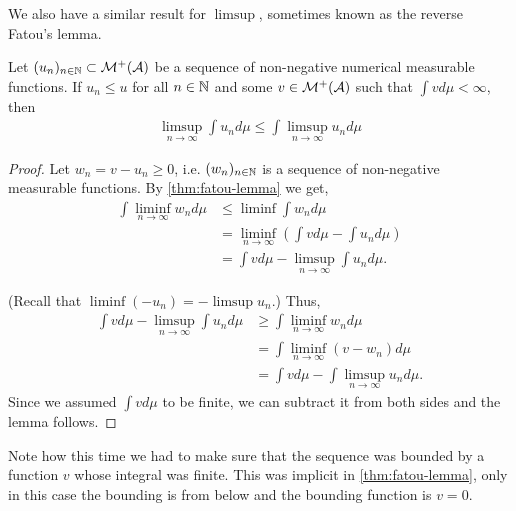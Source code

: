 We also have a similar result for $\limsup$, sometimes known as the reverse Fatou's lemma.

\begin{cor}
	\label{cor:reverse-fatou}
	
	Let $(u_n)_{n\in\mathbb{N}} \subset \mathcal{M}^+(\mathcal{A})$ be a sequence of non-negative numerical measurable functions. If $u_n \leq u$ for all $n \in \mathbb{N}$ and some $v \in \mathcal{M}^+(\mathcal{A})$ such that $\int v d\mu < \infty$, then
	\begin{align}
		\limsup_{n\to\infty} \int u_n d\mu \leq \int \limsup_{n\to \infty} u_n d\mu
	\end{align}
\end{cor}

\begin{proof}
	Let $w_n = v - u_n \geq 0$, i.e. $(w_n)_{n\in\mathbb{N}}$ is a sequence of non-negative measurable functions. By \autoref{thm:fatou-lemma} we get,
	\begin{align*}
		\int \liminf_{n\to \infty} w_n d\mu
		&\leq \liminf \int w_n d\mu \\
		&= \liminf_{n\to \infty} \left( \int v d\mu - \int u_n d\mu \right)\\
		&= \int vd\mu - \limsup_{n\to\infty} \int u_n d\mu.
	\end{align*}
	
	(Recall that $\liminf (-u_n) = -\limsup u_n$.) Thus,
	\begin{align*}
		\int v d\mu - \limsup_{n\to\infty} \int u_n d\mu
		&\geq \int \liminf_{n\to \infty} w_n d\mu \\
		&= \int \liminf_{n\to\infty} \left(v - w_n\right)d\mu \\
		&= \int vd\mu - \int \limsup_{n\to\infty} u_n d\mu.
	\end{align*}
	Since we assumed $\int v d\mu$ to be finite, we can subtract it from both sides and the lemma follows.
\end{proof}

Note how this time we had to make sure that the sequence was bounded by a function $v$ whose integral was finite. This was implicit in \autoref{thm:fatou-lemma}, only in this case the bounding is from below and the bounding function is $v = 0$.